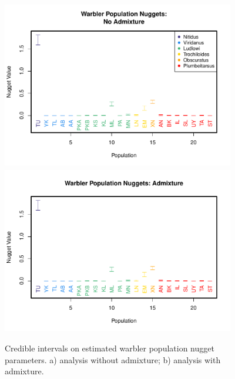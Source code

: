 \documentclass[10pt,letterpaper]{article}
\begin{document}
\begin{figure}
\centering
	\subcaptionbox{\label{warb_pop_noad_nugg}}
		{\includegraphics[width=4in,height=2.89in]{../figs/warblers/warb_pop_NoAd_nugget.pdf}}
	\subcaptionbox{\label{warb_pop_ad_nugg}}
			{\includegraphics[width=4in,height=2.89in]{../figs/warblers/warb_pop_Ad_nugget.pdf}}
	\caption{Credible intervals on estimated warbler population nugget parameters. a) analysis without admixture; b) analysis with admixture.}\label{sfig:warb_pop_nugg}
\end{figure}
\end{document}
